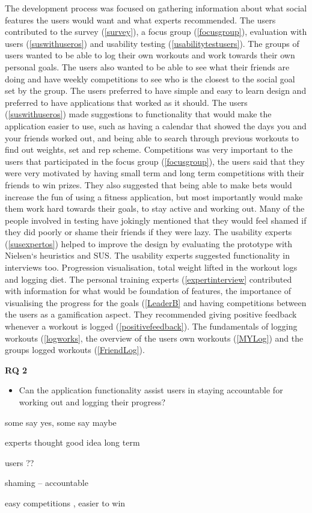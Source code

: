 The development process was focused on gathering information about what social features the users would want and what experts recommended. The users contributed to the survey (\ref{survey}), a focus group (\ref{focusgroup}), evaluation with users (\ref{suswithuseros}) and usability testing (\ref{usabilitytestusers}). The groups of users wanted to be able to log their own workouts and work towards their own personal goals. The users also wanted to be able to see what their friends are doing and have weekly competitions to see who is the closest to the social goal set by the group. The users preferred to have simple and easy to learn design and preferred to have applications that worked as it should. The users (\ref{suswithuseros}) made suggestions to functionality that would make the application easier to use, such as having a calendar that showed the days you and your friends worked out, and being able to search through previous workouts to find out weights, set and rep scheme. Competitions was very important to the users that participated in the focus group (\ref{focusgroup}), the users said that they were very motivated by having small term and long term competitions with their friends to win prizes. They also suggested that being able to make bets would increase the fun of using a fitness application, but most importantly would make them work hard towards their goals, to stay active and working out. Many of the people involved in testing have jokingly mentioned that they would feel shamed if they did poorly or shame their friends if they were lazy.
The usability experts (\ref{susexpertos}) helped to improve the design by evaluating the prototype with Nielsen`s heuristics and SUS. The usability experts suggested functionality in interviews too. Progression visualisation, total weight lifted in the workout logs and logging diet. The personal training experts (\ref{expertinterview} contributed with information for what would be foundation of features, the importance of visualising the progress for the goals (\ref{LeaderB} and having competitions between the users as a gamification aspect.  They recommended giving positive feedback whenever a workout is logged (\ref{positivefeedback}). The fundamentals of logging workouts (\ref{logworks}, the overview of the users own workouts (\ref{MYLog}) and the groups logged workouts (\ref{FriendLog}). 









    

\textbf{RQ 2}
\begin{itemize}
\item Can the application functionality assist users in staying accountable for working out and logging their progress?
\end{itemize}

some say yes, some say maybe
 
 experts thought good idea long term
 
 users ??
 
 shaming -- accountable 
 
 easy competitions , easier to win 